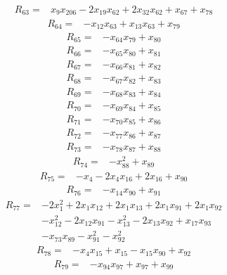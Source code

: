\begin{align*} R_{63}={}&x_{9}x_{206} -2 x_{19}x_{62} +2 x_{32}x_{62} +x_{67} +x_{78}
\end{align*}
\begin{align*} R_{64}={}&-x_{12}x_{63} +x_{13}x_{63} +x_{79}
\end{align*}
\begin{align*} R_{65}={}&-x_{64}x_{79} +x_{80}
\end{align*}
\begin{align*} R_{66}={}&-x_{65}x_{80} +x_{81}
\end{align*}
\begin{align*} R_{67}={}&-x_{66}x_{81} +x_{82}
\end{align*}
\begin{align*} R_{68}={}&-x_{67}x_{82} +x_{83}
\end{align*}
\begin{align*} R_{69}={}&-x_{68}x_{83} +x_{84}
\end{align*}
\begin{align*} R_{70}={}&-x_{69}x_{84} +x_{85}
\end{align*}
\begin{align*} R_{71}={}&-x_{70}x_{85} +x_{86}
\end{align*}
\begin{align*} R_{72}={}&-x_{77}x_{86} +x_{87}
\end{align*}
\begin{align*} R_{73}={}&-x_{78}x_{87} +x_{88}
\end{align*}
\begin{align*} R_{74}={}&-x_{88}^{2} +x_{89}
\end{align*}
\begin{align*} R_{75}={}&-x_{4} -2 x_{4}x_{16} +2 x_{16} +x_{90}
\end{align*}
\begin{align*} R_{76}={}&-x_{14}x_{90} +x_{91}
\end{align*}
\begin{align*} R_{77}={}&-2 x_{1}^{2} +2 x_{1}x_{12} +2 x_{1}x_{13} +2 x_{1}x_{91} +2 x_{1}x_{92}
\\ &-x_{12}^{2} -2 x_{12}x_{91} -x_{13}^{2} -2 x_{13}x_{92} +x_{17}x_{93}
\\ &-x_{73}x_{89} -x_{91}^{2} -x_{92}^{2}
\end{align*}
\begin{align*} R_{78}={}&-x_{4}x_{15} +x_{15} -x_{15}x_{90} +x_{92}
\end{align*}
\begin{align*} R_{79}={}&-x_{94}x_{97} +x_{97} +x_{99}
\end{align*}
